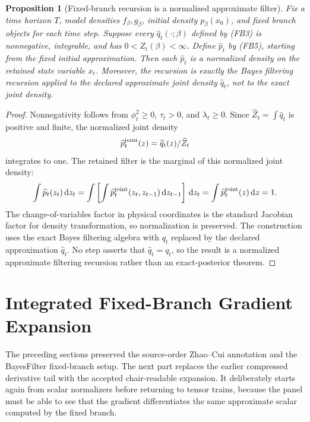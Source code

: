\documentclass[11pt]{article}
\newtheorem{proposition}{Proposition}
\newcommand{\dd}{\,\mathrm d}
\begin{document}
\begin{proposition}[Fixed-branch recursion is a normalized approximate filter]
Fix a time horizon \(T\), model densities \(f_\beta,g_\beta\), initial density
\(p_\beta(x_0)\), and fixed branch objects for each time step.  Suppose every
\(\widehat q_t(\cdot;\beta)\) defined by (FB3) is nonnegative, integrable, and
has \(0<\widehat Z_t(\beta)<\infty\).  Define \(\widehat p_t\) by (FB5),
starting from the fixed initial approximation.  Then each \(\widehat p_t\) is a
normalized density on the retained state variable \(x_t\).  Moreover, the
recursion is exactly the Bayes filtering recursion applied to the declared
approximate joint density \(\widehat q_t\), not to the exact joint density.
\end{proposition}

\begin{proof}
Nonnegativity follows from
\(\phi_t^2\ge0\), \(\tau_t>0\), and \(\lambda_t\ge0\).  Since
\(\widehat Z_t=\int\widehat q_t\) is positive and finite, the normalized joint
density
\[
    \widehat p_t^{\rm joint}(z)
    =
    \widehat q_t(z)/\widehat Z_t
\]
integrates to one.  The retained filter is the marginal of this normalized
joint density:
\[
    \int \widehat p_t(z_t)\dd z_t
    =
    \int
    \left[
    \int \widehat p_t^{\rm joint}(z_t,z_{t-1})\dd z_{t-1}
    \right]\dd z_t
    =
    \int \widehat p_t^{\rm joint}(z)\dd z
    =
    1.
\]
The change-of-variables factor in physical coordinates is the standard
Jacobian factor for density transformation, so normalization is preserved.  The
construction uses the exact Bayes filtering algebra with \(q_t\) replaced by
the declared approximation \(\widehat q_t\).  No step asserts that
\(\widehat q_t=q_t\), so the result is a normalized approximate filtering
recursion rather than an exact-posterior theorem.
\end{proof}


\section{Integrated Fixed-Branch Gradient Expansion}

The preceding sections preserved the source-order Zhao--Cui annotation and the
BayesFilter fixed-branch setup.  The next part replaces the earlier compressed
derivative tail with the accepted chair-readable expansion.  It deliberately
starts again from scalar normalizers before returning to tensor trains, because
the panel must be able to see that the gradient differentiates the same
approximate scalar computed by the fixed branch.
\end{document}
